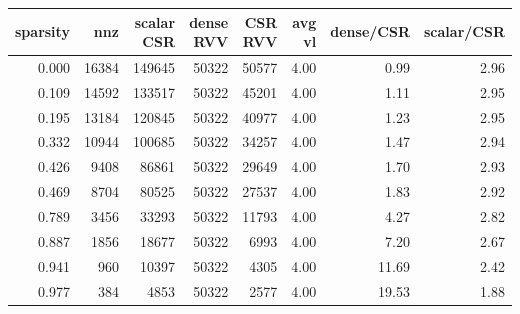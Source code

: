 \begin{tabular}{rrrrrrrr}
\toprule
sparsity & nnz & scalar CSR & dense RVV & CSR RVV & avg vl & dense/CSR & scalar/CSR \\
\midrule
0.000 & 16384 & 149645 & 50322 & 50577 & 4.00 & 0.99 & 2.96 \\
0.109 & 14592 & 133517 & 50322 & 45201 & 4.00 & 1.11 & 2.95 \\
0.195 & 13184 & 120845 & 50322 & 40977 & 4.00 & 1.23 & 2.95 \\
0.332 & 10944 & 100685 & 50322 & 34257 & 4.00 & 1.47 & 2.94 \\
0.426 & 9408 & 86861 & 50322 & 29649 & 4.00 & 1.70 & 2.93 \\
0.469 & 8704 & 80525 & 50322 & 27537 & 4.00 & 1.83 & 2.92 \\
0.789 & 3456 & 33293 & 50322 & 11793 & 4.00 & 4.27 & 2.82 \\
0.887 & 1856 & 18677 & 50322 & 6993 & 4.00 & 7.20 & 2.67 \\
0.941 & 960 & 10397 & 50322 & 4305 & 4.00 & 11.69 & 2.42 \\
0.977 & 384 & 4853 & 50322 & 2577 & 4.00 & 19.53 & 1.88 \\
\bottomrule
\end{tabular}
